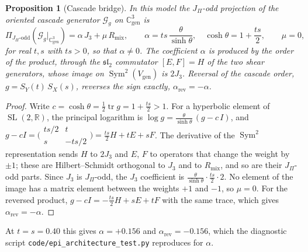 \documentclass[11pt,a4paper]{article}
\newtheorem{proposition}[theorem]{Proposition}
\theoremstyle{definition}
\theoremstyle{remark}
\DeclareMathOperator{\Sym}{Sym}
\newcommand{\SL}{\operatorname{SL}}
\begin{document}
    \begin{proposition}[Cascade bridge]
      \label{prop:dg-bridge}
      In this model the $J_\Pi$-odd projection of the oriented cascade generator
      $\mathcal{G}_g$ on $\mathbb{C}^3_{\mathrm{gen}}$ is
      \begin{equation}
        \label{eq:dg-projection}
        \Pi_{J_\Pi\text{-odd}}\!\left( \mathcal{G}_g\big|_{\mathbb{C}^3_{\mathrm{gen}}} \right)
        = \alpha\, J_3 + \mu\, R_{\mathrm{mix}},
        \qquad
        \alpha = ts\,\frac{\theta}{\sinh\theta},
        \quad
        \cosh\theta = 1 + \frac{ts}{2},
        \qquad
        \mu = 0 ,
      \end{equation}
      for real $t, s$ with $ts > 0$, so that $\alpha \neq 0$.
      The coefficient $\alpha$ is produced by the order of the product, through the $\mathfrak{sl}_2$
      commutator $[E, F] = H$ of the two shear generators, whose image on $\Sym^2(V_{\mathrm{gen}})$ is
      $2J_3$.
      Reversal of the cascade order, $g = S_Y(t)\, S_X(s)$, reverses the sign exactly,
      $\alpha_{\mathrm{rev}} = -\alpha$.
    \end{proposition}

    \begin{proof}
      Write $c = \cosh\theta = \tfrac12 \operatorname{tr} g = 1 + \tfrac{ts}{2} > 1$.
      For a hyperbolic element of $\SL(2,\mathbb{R})$, the principal logarithm is
      $\log g = \tfrac{\theta}{\sinh\theta}\,(g - c\,I)$, and
      $g - cI = \bigl(\begin{smallmatrix} ts/2 & t \\ s & -ts/2 \end{smallmatrix}\bigr)
      = \tfrac{ts}{2} H + t E + s F$.
      The derivative of the $\Sym^2$ representation sends $H$ to $2J_3$ and $E$, $F$ to operators that
      change the weight by $\pm 1$; these are Hilbert--Schmidt orthogonal to $J_3$ and to
      $R_{\mathrm{mix}}$, and so are their $J_\Pi$-odd parts.
      Since $J_3$ is $J_\Pi$-odd, the $J_3$ coefficient is $\tfrac{\theta}{\sinh\theta}\cdot\tfrac{ts}{2}\cdot 2$.
      No element of the image has a matrix element between the weights $+1$ and $-1$, so $\mu = 0$.
      For the reversed product, $g - cI = -\tfrac{ts}{2} H + s E + t F$ with the same trace, which gives
      $\alpha_{\mathrm{rev}} = -\alpha$.
    \end{proof}

    At $t = s = 0.40$ this gives $\alpha = +0.156$ and $\alpha_{\mathrm{rev}} = -0.156$, which the
    diagnostic script \texttt{code/epi\_architecture\_test.py} reproduces for $\alpha$.
\end{document}
